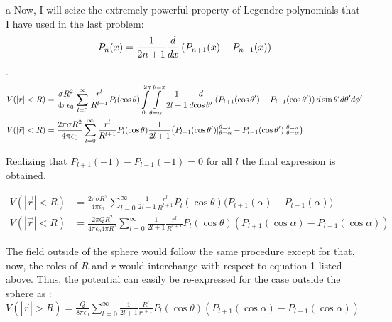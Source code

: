 \begin{homeworkProblem}
\begin{homeworkSection}{a}
Now, I will seize the extremely powerful property of Legendre polynomials that I have used in the last problem: \[P_n(x) = \frac{1}{2n+1} \frac{d{}}{d{x}} \left(P_{n+1}(x)-P_{n-1}(x)\right) \].
\begin{align}
V(|\vec{r}|<R)&=\frac{\sigma  R^2 }{4\pi\epsilon_0} \sum\limits_{l=0}^{\infty} \frac{r^l}{R^{l+1}} P_l(\cos\theta) \int\limits_0^{2\pi}\int\limits_{\theta=\alpha}^{\theta = \pi} \frac{1}{2l+1} \frac{d{}}{d{\cos\theta'}} \left(P_{l+1}(\cos\theta')-P_{l-1}(\cos\theta')\right) d\sin\theta'd\theta'd\phi' \nonumber \\
V(|\vec{r}|<R)&=\frac{2\pi \sigma  R^2 }{4\pi\epsilon_0} \sum\limits_{l=0}^{\infty} \frac{r^l}{R^{l+1}} P_l(\cos\theta) \frac{1}{2l+1}\big(P_{l+1}(\cos\theta')|_{\theta=\alpha}^{\theta =\pi}-P_{l-1}(\cos\theta')|_{\theta = \alpha}^{\theta = \pi}\big) \nonumber
\end{align}

Realizing that $P_{l+1}(-1)-P_{l-1}(-1) = 0$ for all $l$ the final expression is obtained.

\begin{align}
V(|\vec{r}|<R)&=\frac{2\pi \sigma  R^2 }{4\pi\epsilon_0} \sum\limits_{l=0}^{\infty}\frac{1}{2l+1} \frac{r^l}{R^{l+1}} P_l(\cos\theta) \big(P_{l+1}(\alpha)-P_{l-1}(\alpha)\big) \nonumber \\
V(|\vec{r}|<R)&=\frac{2\pi Q R^2}{4 \pi \epsilon_0 4\pi R^2} \sum\limits_{l=0}^{\infty}\frac{1}{2l+1} \frac{r^l}{R^{l+1}} P_l(\cos\theta) \left(P_{l+1}(\cos\alpha)-P_{l-1}(\cos\alpha)\right) \nonumber
\end{align}

\problemAnswer{
\[
V(|\vec{r}|<R)=\frac{Q }{8 \pi \epsilon_0} \sum\limits_{l=0}^{\infty}\frac{1}{2l+1} \frac{r^l}{R^{l+1}} P_l(\cos\theta) \left(P_{l+1}(\cos\alpha)-P_{l-1}(\cos\alpha)\right)
\]
}

The field outside of the sphere would follow the same procedure except for that, now, the roles of $R$ and $r$ would interchange with respect to equation 1 listed above. Thus, the potential can easily be re-expressed for the case outside the sphere as : $V(|\vec{r}|>R) =\frac{Q }{8 \pi \epsilon_0} \sum\limits_{l=0}^{\infty}\frac{1}{2l+1} \frac{R^l}{r^{l+1}} P_l(\cos\theta) \left(P_{l+1}(\cos\alpha)-P_{l-1}(\cos\alpha)\right)$
\end{homeworkSection}


\end{homeworkProblem}
